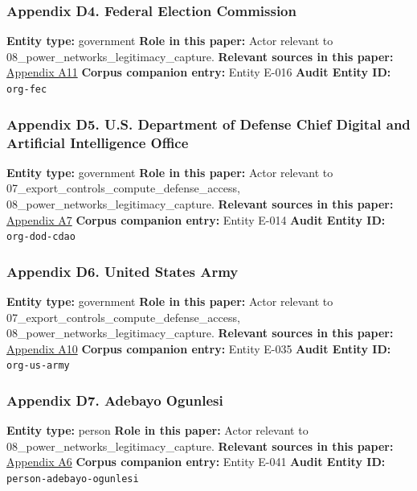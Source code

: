 \documentclass[
  american,
  11pt,
  letterpaper,
]{article}
\begin{document}
\subsubsection{Appendix D4. Federal Election
Commission}\label{appendix-d4-federal-election-commission}

\textbf{Entity type:} government \textbf{Role in this paper:} Actor
relevant to 08\_power\_networks\_legitimacy\_capture. \textbf{Relevant
sources in this paper:}
\hyperref[appendix-a11-leading-the-future-committee-overview]{Appendix
A11} \textbf{Corpus companion entry:} Entity E-016 \textbf{Audit Entity
ID:} \texttt{org-fec}

\subsubsection{Appendix D5. U.S. Department of Defense Chief Digital and
Artificial Intelligence
Office}\label{appendix-d5-u-s-department-of-defense-chief-digital-and-artificial-intelligence-office}

\textbf{Entity type:} government \textbf{Role in this paper:} Actor
relevant to 07\_export\_controls\_compute\_defense\_access,
08\_power\_networks\_legitimacy\_capture. \textbf{Relevant sources in
this paper:}
\hyperref[appendix-a7-introducing-openai-for-government]{Appendix A7}
\textbf{Corpus companion entry:} Entity E-014 \textbf{Audit Entity ID:}
\texttt{org-dod-cdao}

\subsubsection{Appendix D6. United States
Army}\label{appendix-d6-united-states-army}

\textbf{Entity type:} government \textbf{Role in this paper:} Actor
relevant to 07\_export\_controls\_compute\_defense\_access,
08\_power\_networks\_legitimacy\_capture. \textbf{Relevant sources in
this paper:}
\hyperref[appendix-a10-army-launches-detachment-201-executive-innovation-corps-to-drive-tech-transformation]{Appendix
A10} \textbf{Corpus companion entry:} Entity E-035 \textbf{Audit Entity
ID:} \texttt{org-us-army}

\subsubsection{Appendix D7. Adebayo
Ogunlesi}\label{appendix-d7-adebayo-ogunlesi}

\textbf{Entity type:} person \textbf{Role in this paper:} Actor relevant
to 08\_power\_networks\_legitimacy\_capture. \textbf{Relevant sources in
this paper:}
\hyperref[appendix-a6-openai-appoints-one-of-wall-street-s-most-powerful-dealmakers-to-its-board]{Appendix
A6} \textbf{Corpus companion entry:} Entity E-041 \textbf{Audit Entity
ID:} \texttt{person-adebayo-ogunlesi}
\end{document}
